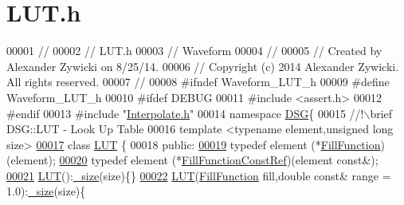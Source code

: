 \hypertarget{_l_u_t_8h_source}{\section{L\+U\+T.\+h}
\label{_l_u_t_8h_source}
}

\begin{DoxyCode}
00001 \textcolor{comment}{//}
00002 \textcolor{comment}{//  LUT.h}
00003 \textcolor{comment}{//  Waveform}
00004 \textcolor{comment}{//}
00005 \textcolor{comment}{//  Created by Alexander Zywicki on 8/25/14.}
00006 \textcolor{comment}{//  Copyright (c) 2014 Alexander Zywicki. All rights reserved.}
00007 \textcolor{comment}{//}
00008 \textcolor{preprocessor}{#ifndef Waveform\_LUT\_h}
00009 \textcolor{preprocessor}{#define Waveform\_LUT\_h}
00010 \textcolor{preprocessor}{#ifdef DEBUG}
00011 \textcolor{preprocessor}{#include <assert.h>}
00012 \textcolor{preprocessor}{#endif}
00013 \textcolor{preprocessor}{#include "\hyperlink{_interpolate_8h}{Interpolate.h}"}
00014 \textcolor{keyword}{namespace }\hyperlink{namespace_d_s_g}{DSG}\{\textcolor{comment}{}
00015 \textcolor{comment}{    //!\(\backslash\)brief DSG::LUT - Look Up Table}
00016 \textcolor{comment}{}    \textcolor{keyword}{template} <\textcolor{keyword}{typename} element,\textcolor{keywordtype}{unsigned} \textcolor{keywordtype}{long} size>
\hypertarget{_l_u_t_8h_source_l00017}{}\hyperlink{class_d_s_g_1_1_l_u_t}{00017}     \textcolor{keyword}{class }\hyperlink{class_d_s_g_1_1_l_u_t}{LUT} \{
00018     \textcolor{keyword}{public}:
\hypertarget{_l_u_t_8h_source_l00019}{}\hyperlink{class_d_s_g_1_1_l_u_t_af2436acdd3f277cc4cac77c3c07cb4ca}{00019}         \textcolor{keyword}{typedef} element (*\hyperlink{class_d_s_g_1_1_l_u_t_af2436acdd3f277cc4cac77c3c07cb4ca}{FillFunction})(element);
\hypertarget{_l_u_t_8h_source_l00020}{}\hyperlink{class_d_s_g_1_1_l_u_t_a69e1198a9a193fee92d676d33ffd3d66}{00020}         \textcolor{keyword}{typedef} element (*\hyperlink{class_d_s_g_1_1_l_u_t_a69e1198a9a193fee92d676d33ffd3d66}{FillFunctionConstRef})(element \textcolor{keyword}{const}&);
\hypertarget{_l_u_t_8h_source_l00021}{}\hyperlink{class_d_s_g_1_1_l_u_t_a9d172f92fe9ea296efce54c9d7f8fdcc}{00021}         \hyperlink{class_d_s_g_1_1_l_u_t_a9d172f92fe9ea296efce54c9d7f8fdcc}{LUT}():\hyperlink{class_d_s_g_1_1_l_u_t_a87c352b5eaea2188955213c0f4ae9799}{\_size}(size)\{\}
\hypertarget{_l_u_t_8h_source_l00022}{}\hyperlink{class_d_s_g_1_1_l_u_t_a68a44636b54a8c1b45c06e0f052d9288}{00022}         \hyperlink{class_d_s_g_1_1_l_u_t_a68a44636b54a8c1b45c06e0f052d9288}{LUT}(\hyperlink{class_d_s_g_1_1_l_u_t_af2436acdd3f277cc4cac77c3c07cb4ca}{FillFunction} fill,\textcolor{keywordtype}{double} \textcolor{keyword}{const}& range = 1.0):\hyperlink{class_d_s_g_1_1_l_u_t_a87c352b5eaea2188955213c0f4ae9799}{\_size}(size)\{

\end{DoxyCode}
